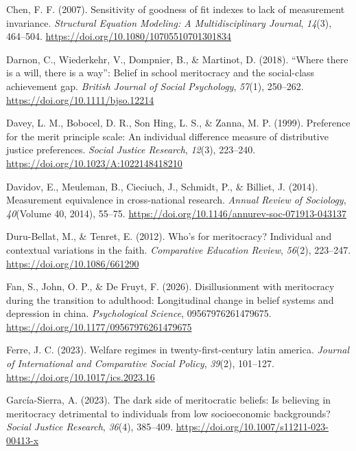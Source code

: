 \documentclass[
  11pt,
]{article}
\newlength{\cslhangindent}
\newenvironment{CSLReferences}[2] %
 {\begin{list}{}{%
  \setlength{\itemindent}{0pt}
  \setlength{\leftmargin}{0pt}
  \setlength{\parsep}{0pt}
  \ifodd #1
   \setlength{\leftmargin}{\cslhangindent}
   \setlength{\itemindent}{-1\cslhangindent}
  \fi
  \setlength{\itemsep}{#2\baselineskip}}}
 {\end{list}}
\begin{document}
\begin{CSLReferences}{1}{0}
Chen, F. F. (2007). Sensitivity of goodness of fit indexes to lack of
measurement invariance. \emph{Structural Equation Modeling: A
Multidisciplinary Journal}, \emph{14}(3), 464--504.
\url{https://doi.org/10.1080/10705510701301834}

Darnon, C., Wiederkehr, V., Dompnier, B., \& Martinot, D. (2018).
{``Where there is a will, there is a way''}: Belief in school
meritocracy and the social-class achievement gap. \emph{British Journal
of Social Psychology}, \emph{57}(1), 250--262.
\url{https://doi.org/10.1111/bjso.12214}

Davey, L. M., Bobocel, D. R., Son Hing, L. S., \& Zanna, M. P. (1999).
Preference for the merit principle scale: An individual difference
measure of distributive justice preferences. \emph{Social Justice
Research}, \emph{12}(3), 223--240.
\url{https://doi.org/10.1023/A:1022148418210}

Davidov, E., Meuleman, B., Cieciuch, J., Schmidt, P., \& Billiet, J.
(2014). Measurement equivalence in cross-national research. \emph{Annual
Review of Sociology}, \emph{40}(Volume 40, 2014), 55--75.
\url{https://doi.org/10.1146/annurev-soc-071913-043137}

Duru-Bellat, M., \& Tenret, E. (2012). Who's for meritocracy? Individual
and contextual variations in the faith. \emph{Comparative Education
Review}, \emph{56}(2), 223--247. \url{https://doi.org/10.1086/661290}

Fan, S., John, O. P., \& De Fruyt, F. (2026). Disillusionment with
meritocracy during the transition to adulthood: Longitudinal change in
belief systems and depression in china. \emph{Psychological Science},
09567976261479675. \url{https://doi.org/10.1177/09567976261479675}

Ferre, J. C. (2023). Welfare regimes in twenty-first-century latin
america. \emph{Journal of International and Comparative Social Policy},
\emph{39}(2), 101--127. \url{https://doi.org/10.1017/ics.2023.16}

García-Sierra, A. (2023). The dark side of meritocratic beliefs: Is
believing in meritocracy detrimental to individuals from low
socioeconomic backgrounds? \emph{Social Justice Research}, \emph{36}(4),
385--409. \url{https://doi.org/10.1007/s11211-023-00413-x}


\end{CSLReferences}
\end{document}
